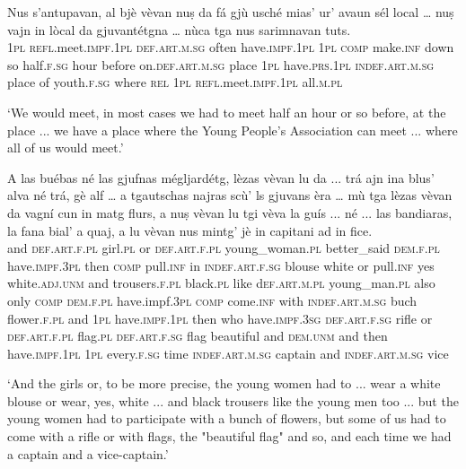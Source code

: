 \begin{linenumbers}
	\gll Nus s’antupavan, al bjè vèvan nuṣ da fá gjù usché mias’ ur’ avaun sél local … nuṣ vajn in lòcal da gjuvantétgna … nùca tga nus sarimnavan tuts.   \\
	\textsc{1pl} \textsc{refl}.meet.\textsc{impf.1pl} \textsc{def.art.m.sg} often have.\textsc{impf.1pl} \textsc{1pl} \textsc{comp} make.\textsc{inf} down so half.\textsc{f.sg} hour before on.\textsc{def.art.m.sg} place {} \textsc{1pl} have.\textsc{prs.1pl} \textsc{indef.art.m.sg} place of youth.\textsc{f.sg} {} where \textsc{rel} \textsc{1pl} \textsc{refl}.meet.\textsc{impf.1pl} all.\textsc{m.pl} \\
\end{linenumbers}
\medskip
\glt `We would meet, in most cases we had to meet half an hour or so before, at the place ... we have a place where the Young People's Association can meet ... where all of us would meet.'
\medskip

\begin{linenumbers}
	\gll A las buébas né las gjufnas mégljardétg, lèzas vèvan lu da ... trá ajn ina blus’ alva né trá, gè alf … a tgautschas najras scù’ ls gjuvans èra … mù tga lèzas vèvan da vagní cun in matg flurs, a nuṣ vèvan lu tgi vèva la guís ... né ... las bandiaras, la fana bial’ a quaj, a lu vèvan nus mintg’ jè in capitani ad in fice.   \\
and \textsc{def.art.f.pl} girl.\textsc{pl} or \textsc{def.art.f.pl} young\_woman.\textsc{pl} better\_said \textsc{dem.f.pl} have.\textsc{impf.3pl} then \textsc{comp} {} pull.\textsc{inf} in \textsc{indef.art.f.sg} blouse white or pull.\textsc{inf} yes white.\textsc{adj.unm} {} and trousers.\textsc{f.pl} black.\textsc{pl} like d\textsc{ef.art.m.pl} young\_man.\textsc{pl} also {} only \textsc{comp} \textsc{dem.f.pl} have.impf.\textsc{3pl} \textsc{comp} come.\textsc{inf} with \textsc{indef.art.m.sg} buch flower.\textsc{f.pl} and \textsc{1pl} have.\textsc{impf.1pl} then who have.\textsc{impf.3sg} \textsc{def.art.f.sg} rifle {} or {} \textsc{def.art.f.pl} flag.\textsc{pl} \textsc{def.art.f.sg} flag beautiful and \textsc{dem.unm} and then have.\textsc{impf.1pl} \textsc{1pl} every.\textsc{f.sg} time \textsc{indef.art.m.sg} captain and \textsc{indef.art.m.sg} vice 	\\
\end{linenumbers}
\medskip
\glt `And the girls or, to be more precise, the young women had to ... wear a white blouse or wear, yes, white ... and black trousers like the young men too ... but the young women had to participate with a bunch of flowers, but some of us had to come with a rifle or with flags, the "beautiful flag" and so, and each time we had a captain and a vice-captain.'
\medskip

